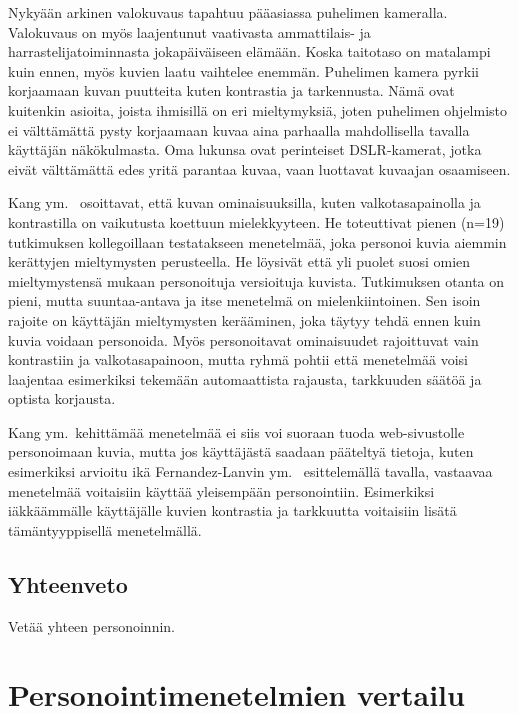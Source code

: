 \documentclass[finnish, 12pt, a4paper, elec, utf8, a-1b, online]{aaltothesis}
\begin{document}
Nykyään arkinen valokuvaus tapahtuu pääasiassa puhelimen kameralla. Valokuvaus
on myös laajentunut vaativasta ammattilais- ja harrastelijatoiminnasta
jokapäiväiseen elämään. Koska taitotaso on matalampi kuin ennen, myös kuvien
laatu vaihtelee enemmän. Puhelimen kamera pyrkii korjaamaan kuvan puutteita
kuten kontrastia ja tarkennusta. Nämä ovat kuitenkin asioita, joista ihmisillä
on eri mieltymyksiä, joten puhelimen ohjelmisto ei välttämättä pysty korjaamaan
kuvaa aina parhaalla mahdollisella tavalla käyttäjän näkökulmasta. Oma lukunsa
ovat perinteiset DSLR-kamerat, jotka eivät välttämättä edes yritä parantaa
kuvaa, vaan luottavat kuvaajan osaamiseen.

Kang ym.~\cite{5539850} osoittavat, että kuvan ominaisuuksilla, kuten
valkotasapainolla ja kontrastilla on vaikutusta koettuun mielekkyyteen. He
toteuttivat pienen (n=19) tutkimuksen kollegoillaan testatakseen menetelmää,
joka personoi kuvia aiemmin kerättyjen mieltymysten perusteella. He löysivät
että yli puolet suosi omien mieltymystensä mukaan personoituja versioituja
kuvista. Tutkimuksen otanta on pieni, mutta suuntaa-antava ja itse menetelmä on
mielenkiintoinen. Sen isoin rajoite on käyttäjän mieltymysten kerääminen, joka
täytyy tehdä ennen kuin kuvia voidaan personoida. Myös personoitavat
ominaisuudet rajoittuvat vain kontrastiin ja valkotasapainoon, mutta ryhmä
pohtii että menetelmää voisi laajentaa esimerkiksi tekemään automaattista
rajausta, tarkkuuden säätöä ja optista korjausta.

Kang ym.~kehittämää menetelmää ei siis voi suoraan tuoda web-sivustolle
personoimaan kuvia, mutta jos käyttäjästä saadaan pääteltyä tietoja, kuten
esimerkiksi arvioitu ikä Fernandez-Lanvin ym.~\cite{fernandez2018dimension}
esittelemällä tavalla, vastaavaa menetelmää voitaisiin käyttää yleisempään
personointiin. Esimerkiksi iäkkäämmälle käyttäjälle kuvien kontrastia ja
tarkkuutta voitaisiin lisätä tämäntyyppisellä menetelmällä.

\subsection{Yhteenveto}

Vetää yhteen personoinnin.

\clearpage

\section{Personointimenetelmien vertailu}
\end{document}
